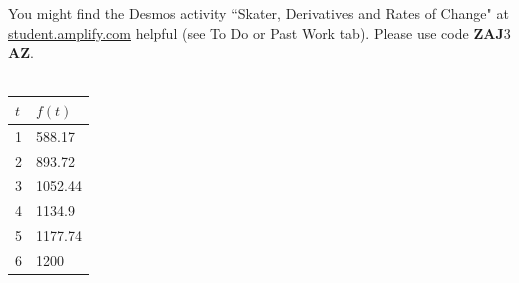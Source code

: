 \documentclass[10pt]{article}
\def\desmosClassCode{{\bf ZAJ$3$AZ}}
\begin{document}
{You might find the Desmos activity ``Skater, Derivatives and Rates of Change" at \href{https://student.amplify.com/}{student.amplify.com} helpful (see To Do or Past Work tab). Please use code \desmosClassCode.\\\\
 \begin{tabular}{| l | l |}
    \hline
    $t$ & $f(t)$\\
    \hline\hline
    1 & 588.17\\
    2 & 893.72\\
    3 & 1052.44\\
    4 & 1134.9\\
    5 & 1177.74\\
    6 & 1200\\
    \hline
    \end{tabular}
}
    \hfill\,
\end{document}
